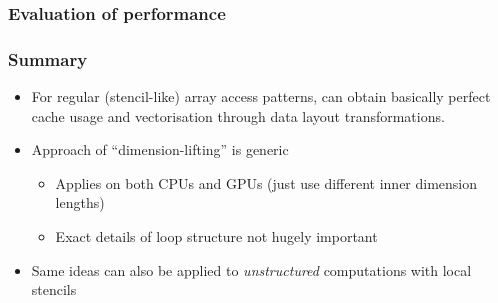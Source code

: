 \documentclass[presentation,aspectratio=43,10pt]{beamer}
\begin{document}
\begin{frame}
  \frametitle{Evaluation of performance}
  \begin{center}
  \end{center}
\end{frame}


\begin{frame}
  \frametitle{Summary}
  \begin{itemize}
  \item For regular (stencil-like) array access patterns, can obtain
    basically perfect cache usage and vectorisation through data
    layout transformations.
  \item Approach of ``dimension-lifting'' is generic
    \begin{itemize}
    \item Applies on both CPUs and GPUs (just use different inner
      dimension lengths)
    \item Exact details of loop structure not hugely important
    \end{itemize}
  \item Same ideas can also be applied to \emph{unstructured}
    computations with local stencils
  \end{itemize}
\end{frame}
\end{document}
